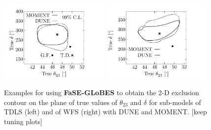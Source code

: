 \documentclass[aps,prd,nofootinbib,preprint]{revtex4}
\begin{document}
\begin{figure}[!h]
 \centering
\includegraphics[width=0.48\textwidth]{Figs/SR_th23_dCP_DUNE_MOMENT.pdf}
\includegraphics[width=0.48\textwidth]{Figs/SR_th23_dCP_WFS.pdf}
\caption{\label{fig:th23_delta}Examples for using \textbf{FaSE-GLoBES} to obtain the 2-D exclusion contour on the plane of true values of $\theta_{23}$ and $\delta$ for sub-models of TDLS (left) and of WFS (right) with DUNE and MOMENT. {\color{red} [keep tuning plots]}}
\end{figure}
\end{document}
